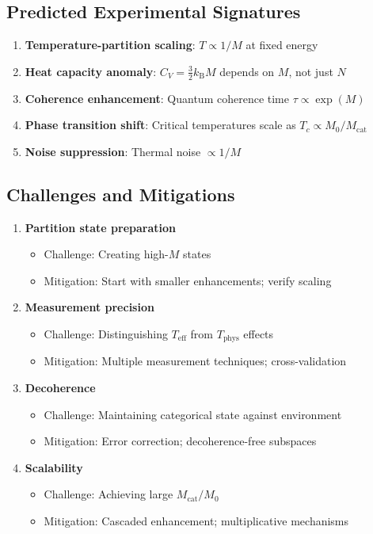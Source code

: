 \documentclass[twocolumn,10pt,twoside]{article}
\newcommand{\kb}{k_{\mathrm{B}}}
\newcommand{\Teff}{T_{\mathrm{eff}}}
\newcommand{\Tphys}{T_{\mathrm{phys}}}
\newcommand{\Mcat}{M_{\mathrm{cat}}}
\begin{document}
\subsection{Predicted Experimental Signatures}

\begin{enumerate}
    \item \textbf{Temperature-partition scaling}: $T \propto 1/M$ at fixed energy

    \item \textbf{Heat capacity anomaly}: $C_V = \frac{3}{2}\kb M$ depends on $M$, not just $N$

    \item \textbf{Coherence enhancement}: Quantum coherence time $\tau \propto \exp(M)$

    \item \textbf{Phase transition shift}: Critical temperatures scale as $T_c \propto M_0/\Mcat$

    \item \textbf{Noise suppression}: Thermal noise $\propto 1/M$
\end{enumerate}

\subsection{Challenges and Mitigations}

\begin{enumerate}
    \item \textbf{Partition state preparation}
    \begin{itemize}
        \item Challenge: Creating high-$M$ states
        \item Mitigation: Start with smaller enhancements; verify scaling
    \end{itemize}

    \item \textbf{Measurement precision}
    \begin{itemize}
        \item Challenge: Distinguishing $\Teff$ from $\Tphys$ effects
        \item Mitigation: Multiple measurement techniques; cross-validation
    \end{itemize}

    \item \textbf{Decoherence}
    \begin{itemize}
        \item Challenge: Maintaining categorical state against environment
        \item Mitigation: Error correction; decoherence-free subspaces
    \end{itemize}

    \item \textbf{Scalability}
    \begin{itemize}
        \item Challenge: Achieving large $\Mcat/M_0$
        \item Mitigation: Cascaded enhancement; multiplicative mechanisms
    \end{itemize}
\end{enumerate}
\end{document}
